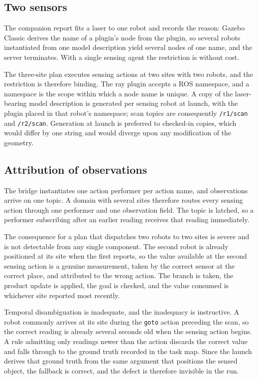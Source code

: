 \documentclass[11pt,a4paper]{article}
\theoremstyle{definition}
\newcommand{\code}[1]{\texttt{\small #1}}
\begin{document}
\subsection{Two sensors}

The companion report fits a laser to one robot and records the reason: Gazebo
Classic derives the name of a plugin's node from the plugin, so several robots
instantiated from one model description yield several nodes of one name, and
the server terminates. With a single sensing agent the restriction is without
cost.

The three-site plan executes sensing actions at two sites with two robots, and
the restriction is therefore binding. The ray plugin accepts a ROS namespace,
and a namespace is the scope within which a node name is unique. A copy of the
laser-bearing model description is generated per sensing robot at launch, with
the plugin placed in that robot's namespace; scan topics are consequently
\code{/r1/scan} and \code{/r2/scan}. Generation at launch is preferred to
checked-in copies, which would differ by one string and would diverge upon any
modification of the geometry.

\subsection{Attribution of observations}
\label{sec:attribution}

The bridge instantiates one action performer per action name, and observations
arrive on one topic. A domain with several sites therefore routes every sensing
action through one performer and one observation field. The topic is latched,
so a performer subscribing after an earlier reading receives that reading
immediately.

The consequence for a plan that dispatches two robots to two sites is severe
and is not detectable from any single component. The second robot is already
positioned at its site when the first reports, so the value available at the
second sensing action is a genuine measurement, taken by the correct sensor at
the correct place, and attributed to the wrong action. The branch is taken, the
product update is applied, the goal is checked, and the value consumed is
whichever site reported most recently.

Temporal disambiguation is inadequate, and the inadequacy is instructive. A
robot commonly arrives at its site during the \code{goto} action preceding the
scan, so the correct reading is already several seconds old when the sensing
action begins. A rule admitting only readings newer than the action discards
the correct value and falls through to the ground truth recorded in the task
map. Since the launch derives that ground truth from the same argument that
positions the sensed object, the fallback is correct, and the defect is
therefore invisible in the run.
\end{document}

